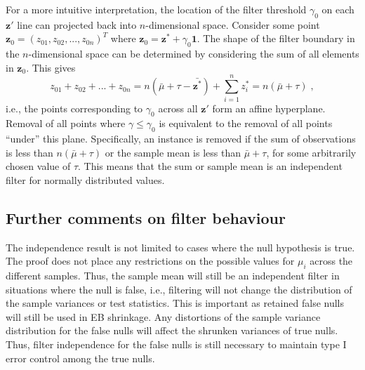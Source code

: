\documentclass{article}
\newcommand{\nsamples}{n}
\newcommand{\sample}{i}
\newcommand{\normean}{\mu}
\newcommand{\modifier}{\gamma}
\newcommand{\logcount}{z}
\newcommand{\modobs}[0]{\mathbf{\logcount}'}
\newcommand{\instance}[0]{\mathbf{\logcount}^*}
\newcommand{\filter}[0]{\mathbf{\logcount}_0}
\newcommand{\allones}[0]{\mathbf{1}}
\newcommand{\threshold}{\tau}
\begin{document}
For a more intuitive interpretation, the location of the filter threshold $\modifier_0$ on each $\modobs$ line can projected back into $\nsamples$-dimensional space.  
Consider some point $\filter= (\logcount_{01}, \logcount_{02}, ..., \logcount_{0\nsamples})^T$ where $\filter=\instance+\modifier_0\allones$.
The shape of the filter boundary in the $n$-dimensional space can be determined by considering the sum of all elements in $\filter$.  
This gives
\[
\logcount_{01} + \logcount_{02} + ... + \logcount_{0\nsamples} = \nsamples(\bar\normean + \threshold - \bar{\instance}) + \sum_{\sample=1}^\nsamples \logcount^*_\sample = \nsamples(\bar\normean + \threshold) \;,
\]
i.e., the points corresponding to $\modifier_0$ across all $\modobs$ form an affine hyperplane. 
Removal of all points where $\modifier \le \modifier_0$ is equivalent to the removal of all points ``under'' this plane. 
Specifically, an instance is removed if the sum of observations is less than $\nsamples(\bar\normean+\threshold)$ or the sample mean is less than $\bar\normean + \threshold$, for some arbitrarily chosen value of $\threshold$.  
This means that the sum or sample mean is an independent filter for normally distributed values.


\subsection{Further comments on filter behaviour}

The independence result is not limited to cases where the null hypothesis is true.
The proof does not place any restrictions on the possible values for $\normean_\sample$ across the different samples.
Thus, the sample mean will still be an independent filter in situations where the null is false, i.e., filtering will not change the distribution of the sample variances or test statistics.
This is important as retained false nulls will still be used in EB shrinkage.
Any distortions of the sample variance distribution for the false nulls will affect the shrunken variances of true nulls.
Thus, filter independence for the false nulls is still necessary to maintain type I error control among the true nulls.
\end{document}

